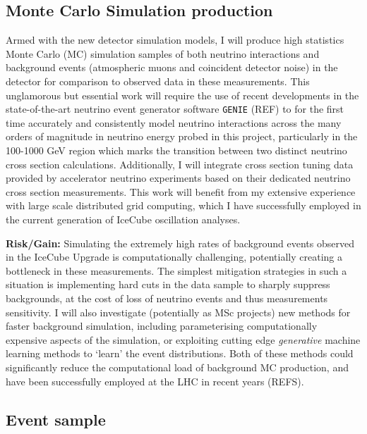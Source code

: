 \documentclass[a4paper,11pt]{article}
\begin{document}
\subsection{Monte Carlo Simulation production}

Armed with the new detector simulation models, I will produce high statistics Monte Carlo (MC) simulation samples of both neutrino interactions and background events (atmospheric muons and coincident detector noise) in the detector for comparison to observed data in these measurements. This unglamorous but essential work will require the use of recent developments in the state-of-the-art neutrino event generator software \texttt{GENIE} (REF) to for the first time accurately and consistently model neutrino interactions across the many orders of magnitude in neutrino energy probed in this project, particularly in the 100-1000 GeV region which marks the transition between two distinct neutrino cross section calculations. Additionally, I will integrate cross section tuning data provided by accelerator neutrino experiments based on their dedicated neutrino cross section measurements. This work will benefit from my extensive experience with large scale distributed grid computing, which I have successfully employed in the current generation of IceCube oscillation analyses.


\textbf{Risk/Gain:} Simulating the extremely high rates of background events observed in the IceCube Upgrade is computationally challenging, potentially creating a bottleneck in these measurements. The simplest mitigation strategies in such a situation is implementing hard cuts in the data sample to sharply suppress backgrounds, at the cost of loss of neutrino events and thus measurements sensitivity. I will also investigate (potentially as MSc projects) new methods for faster background simulation, including parameterising computationally expensive aspects of the simulation, or exploiting cutting edge \textit{generative} machine learning methods to `learn' the event distributions. Both of these methods could significantly reduce the computational load of background MC production, and have been successfully employed at the LHC in recent years (REFS). \\


\subsection{Event sample}
\end{document}
